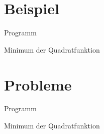 \documentclass[\outputformat]{beamer}
\begin{document}


\section{Beispiel}
\begin{frame}{Programm}\tableofcontents[currentsection]\end{frame}

\begin{frame}{Minimum der Quadratfunktion}

\end{frame}

\section{Probleme}
\begin{frame}{Programm}\tableofcontents[currentsection]\end{frame}

\begin{frame}{Minimum der Quadratfunktion}

\end{frame}


\end{document}
